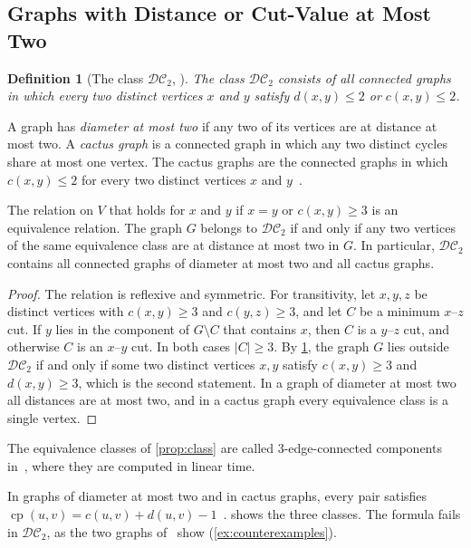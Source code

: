 \documentclass[pdflatex,sn-mathphys-num]{sn-jnl}%
\theoremstyle{thmstyleone}%
\theoremstyle{thmstyletwo}%
\theoremstyle{thmstylethree}%
\newtheorem{definition}{Definition}%
\newcommand{\cp}{\operatorname{cp}}%
\newcommand{\DC}{\mathcal{DC}_2}%
\begin{document}
\subsection{Graphs with Distance or Cut-Value at Most Two}
\label{sec:class}

\begin{definition}[The class $\DC$, {\cite[Definition~37]{Michel2025MinCutPath}}]
\label{def:class}
The class $\DC$ consists of all connected graphs in which every two distinct vertices $x$ and $y$ satisfy $d(x, y) \leq 2$ or $c(x, y) \leq 2$.
\end{definition}

A graph has \emph{diameter at most two} if any two of its vertices are at distance at most two.
A \emph{cactus graph} is a connected graph in which any two distinct cycles share at most one vertex.
The cactus graphs are the connected graphs in which $c(x, y) \leq 2$ for every two distinct vertices $x$ and $y$~\cite[Lemma~6.1]{Michel2026MinCutPath}.

\begin{proposition}
\label{prop:class}
The relation on $V$ that holds for $x$ and $y$ if $x = y$ or $c(x, y) \geq 3$ is an equivalence relation.
The graph $G$ belongs to $\DC$ if and only if any two vertices of the same equivalence class are at distance at most two in $G$.
In particular, $\DC$ contains all connected graphs of diameter at most two and all cactus graphs.
\end{proposition}

\begin{proof}
The relation is reflexive and symmetric.
For transitivity, let $x, y, z$ be distinct vertices with $c(x, y) \geq 3$ and $c(y, z) \geq 3$, and let $C$ be a minimum $x$--$z$ cut.
If $y$ lies in the component of $G \setminus C$ that contains $x$, then $C$ is a $y$--$z$ cut, and otherwise $C$ is an $x$--$y$ cut.
In both cases $|C| \geq 3$.
By \cref{def:class}, the graph $G$ lies outside $\DC$ if and only if some two distinct vertices $x, y$ satisfy $c(x, y) \geq 3$ and $d(x, y) \geq 3$, which is the second statement.
In a graph of diameter at most two all distances are at most two, and in a cactus graph every equivalence class is a single vertex.
\end{proof}

The equivalence classes of \cref{prop:class} are called 3-edge-connected components in~\cite{Mehlhorn2017Certifying}, where they are computed in linear time.

In graphs of diameter at most two and in cactus graphs, every pair satisfies $\cp(u, v) = c(u, v) + d(u, v) - 1$~\cite[Theorems~5.5 and~6.2]{Michel2026MinCutPath}.
 shows the three classes.
The formula fails in $\DC$, as the two graphs of~\cite[Figure~3.3]{Michel2025MinCutPath} show (\cref{ex:counterexamples}).
\end{document}
